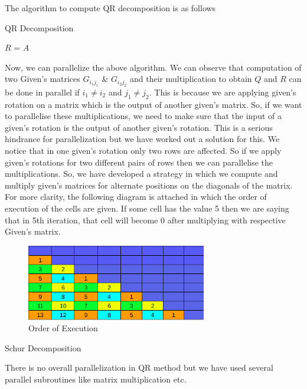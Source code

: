\documentclass[12pt,a4paper]{article}
\begin{document}
The algorithm to compute QR decomposition is as follows

\begin{algorithm}
\caption{QR Decomposition}\label{euclid}
\begin{algorithmic}[1]
\State $R$ = $A$
\State {}
    \EndFor
\EndFor
{}
\end{algorithmic}
\end{algorithm}


Now, we can parallelize the above algorithm. We can observe that computation of two Given's matrices $G_{i_{1}j_{1}}$ & $G_{i_{2}j_{2}}$ and their multiplication to obtain $Q$ and $R$ can be done in parallel if $i_{1} \neq i_{2}$ and $j_{1} \neq j_{2}$. This is because we are applying given's rotation on a matrix which is the output of another given's matrix. So, if we want to parallelise these multiplications, we need to make sure that the input of a given's rotation is the output of another given's rotation. This is a serious hindrance for parallelization but we have worked out a solution for this. We notice that in one given's rotation only two rows are affected. So if we apply given's rotations for two different pairs of rows then we can parallelise the multiplications. So, we have developed a strategy in which we compute and multiply given's matrices for alternate positions on the diagonals of the matrix. For more clarity, the following diagram is attached in which the order of execution of the cells are given. If some cell has the value 5 then we are saying that in 5th iteration, that cell will become 0 after multiplying with respective Given's matrix.

\begin{figure}
    \centering
    \includegraphics[width=0.70\textwidth]{givens.png}
    \caption{Order of Execution}
\end{figure}

\begin{algorithm}
\caption{Schur Decomposition}\label{euclid}
\begin{algorithmic}[1]
\State {}
\EndFor
{}
\end{algorithmic}
\end{algorithm}
There is no overall parallelization in QR method but we have used several parallel subroutines like matrix multiplication etc.
\end{document}
